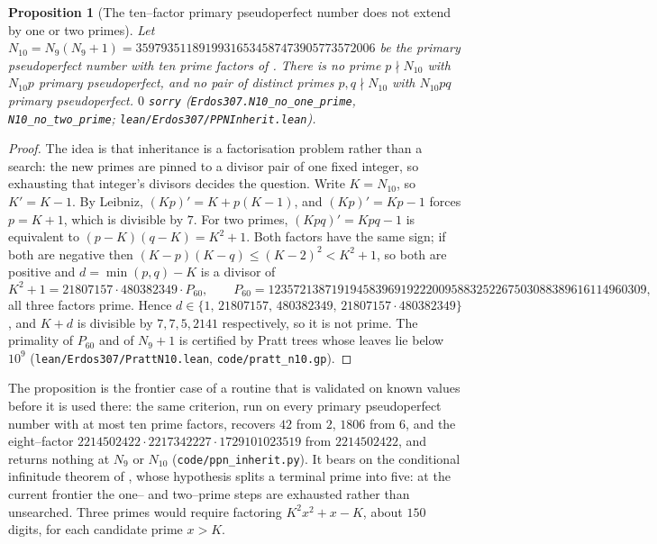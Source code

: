 \documentclass[11pt]{article}
\newtheorem{proposition}[theorem]{Proposition}
\theoremstyle{definition}
\begin{document}
\begin{proposition}[The ten--factor primary pseudoperfect number does not extend by one or two primes]\label{prop:ppninherit}
Let $N_{10}=N_9(N_9+1)=35979351189199316534587473905773572006$ be the primary pseudoperfect number with
ten prime factors of \cite{PortFillings2026}. There is no prime $p\nmid N_{10}$ with $N_{10}p$ primary
pseudoperfect, and no pair of distinct primes $p,q\nmid N_{10}$ with $N_{10}pq$ primary pseudoperfect.
$0$ \texttt{sorry} \textup{(\texttt{Erdos307.N10\_no\_one\_prime}, \texttt{N10\_no\_two\_prime};
\texttt{lean/Erdos307/PPNInherit.lean})}.
\end{proposition}
\begin{proof}
The idea is that inheritance is a factorisation problem rather than a search: the new primes are
pinned to a divisor pair of one fixed integer, so exhausting that integer's divisors decides the
question. Write $K=N_{10}$, so $K'=K-1$. By Leibniz, $(Kp)'=K+p(K-1)$, and $(Kp)'=Kp-1$ forces
$p=K+1$, which is divisible by $7$. For two primes, $(Kpq)'=Kpq-1$ is equivalent to
$(p-K)(q-K)=K^{2}+1$. Both factors have the same sign; if both are negative then
$(K-p)(K-q)\le(K-2)^{2}<K^{2}+1$, so both are positive and $d=\min(p,q)-K$ is a divisor of
\[ K^{2}+1=21807157\cdot480382349\cdot P_{60},\qquad
   P_{60}=123572138719194583969192220095883252267503088389616114960309, \]
all three factors prime. Hence $d\in\{1,\,21807157,\,480382349,\,21807157\cdot480382349\}$, and
$K+d$ is divisible by $7,7,5,2141$ respectively, so it is not prime. The primality of $P_{60}$ and of
$N_9+1$ is certified by Pratt trees whose leaves lie below $10^{9}$
\textup{(\texttt{lean/Erdos307/PrattN10.lean}, \texttt{code/pratt\_n10.gp})}.
\end{proof}

The proposition is the frontier case of a routine that is validated on known values before it is
used there: the same criterion, run on every primary pseudoperfect number with at most ten prime
factors, recovers $42$ from $2$, $1806$ from $6$, and the eight--factor
$2214502422\cdot2217342227\cdot1729101023519$ from $2214502422$, and returns nothing at $N_9$ or $N_{10}$
\textup{(\texttt{code/ppn\_inherit.py})}. It bears on the conditional infinitude theorem of
\cite{PortFillings2026}, whose hypothesis splits a terminal prime into five: at the current frontier
the one-- and two--prime steps are exhausted rather than unsearched. Three primes would require
factoring $K^{2}x^{2}+x-K$, about $150$ digits, for each candidate prime $x>K$.
\end{document}
